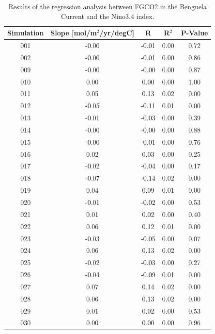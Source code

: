 \documentclass[12pt]{article}
\begin{document}
\newpage
\begin{table}[p!]
	\centering
	\caption{Results of the regression analysis between FGCO2 in the Benguela Current and the Nino3.4 index.}
\begin{tabular}{c | c c c c}
	\toprule
	\textbf{Simulation} &  \textbf{Slope} [mol/m$^{2}$/yr/degC] &  \textbf{R} &  \textbf{R$^{2}$} & P-Value \\
	\midrule
	001 &  -0.00 &    -0.01 &       0.00 &     0.72 \\
	002 &  -0.00 &    -0.01 &       0.00 &     0.86 \\
	009 &  -0.00 &    -0.00 &       0.00 &     0.87 \\
	010 &   0.00 &     0.00 &       0.00 &     1.00 \\
	011 &   0.05 &     0.13 &       0.02 &     0.00 \\
	012 &  -0.05 &    -0.11 &       0.01 &     0.00 \\
	013 &  -0.01 &    -0.03 &       0.00 &     0.39 \\
	014 &  -0.00 &    -0.00 &       0.00 &     0.88 \\
	015 &  -0.00 &    -0.01 &       0.00 &     0.76 \\
	016 &   0.02 &     0.03 &       0.00 &     0.25 \\
	017 &  -0.02 &    -0.04 &       0.00 &     0.17 \\
	018 &  -0.07 &    -0.14 &       0.02 &     0.00 \\
	019 &   0.04 &     0.09 &       0.01 &     0.00 \\
	020 &  -0.01 &    -0.02 &       0.00 &     0.53 \\
	021 &   0.01 &     0.02 &       0.00 &     0.40 \\
	022 &   0.06 &     0.12 &       0.01 &     0.00 \\
	023 &  -0.03 &    -0.05 &       0.00 &     0.07 \\
	024 &   0.06 &     0.13 &       0.02 &     0.00 \\
	025 &  -0.02 &    -0.03 &       0.00 &     0.27 \\
	026 &  -0.04 &    -0.09 &       0.01 &     0.00 \\
	027 &   0.07 &     0.14 &       0.02 &     0.00 \\
	028 &   0.06 &     0.13 &       0.02 &     0.00 \\
	029 &   0.01 &     0.02 &       0.00 &     0.53 \\
	030 &   0.00 &     0.00 &       0.00 &     0.96 \\

\end{tabular}
\end{table}
\end{document}
